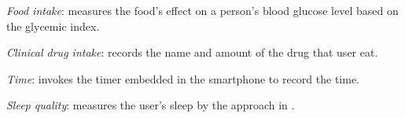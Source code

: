 \emph{Food intake}: 
\sysname measures the food's effect on a person's blood glucose level based on the glycemic index.

\emph{Clinical drug intake}: 
\sysname records the name and amount of the drug that user eat.

\emph{Time}: 
\sysname invokes the timer embedded in the smartphone to record the time.

\emph{Sleep quality}: 
\sysname measures the user's sleep by the approach in \cite{gu2014intelligent}.
